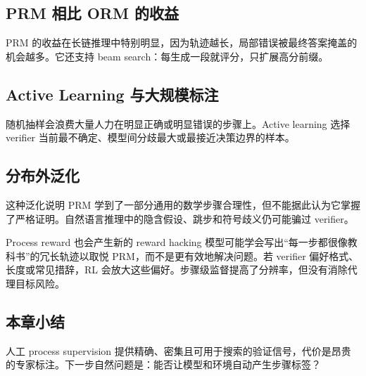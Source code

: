 \subsection{PRM 相比 ORM 的收益}


PRM 的收益在长链推理中特别明显，因为轨迹越长，局部错误被最终答案掩盖的机会越多。它还支持 beam search：每生成一段就评分，只扩展高分前缀。

\subsection{Active Learning 与大规模标注}

随机抽样会浪费大量人力在明显正确或明显错误的步骤上。Active learning 选择 verifier 当前最不确定、模型间分歧最大或最接近决策边界的样本。


\subsection{分布外泛化}


这种泛化说明 PRM 学到了一部分通用的数学步骤合理性，但不能据此认为它掌握了严格证明。自然语言推理中的隐含假设、跳步和符号歧义仍可能骗过 verifier。

\begin{warningbox}{Process reward 也会产生新的 reward hacking}
模型可能学会写出“每一步都很像教科书”的冗长轨迹以取悦 PRM，而不是更有效地解决问题。若 verifier 偏好格式、长度或常见措辞，RL 会放大这些偏好。步骤级监督提高了分辨率，但没有消除代理目标风险。
\end{warningbox}

\subsection{本章小结}

人工 process supervision 提供精确、密集且可用于搜索的验证信号，代价是昂贵的专家标注。下一步自然问题是：能否让模型和环境自动产生步骤标签？

